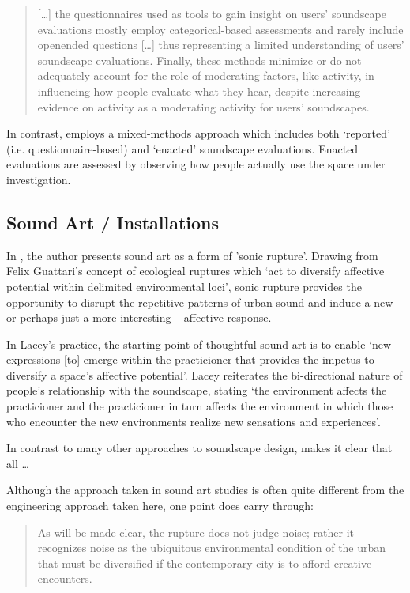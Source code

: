 \begin{quote}
  [\dots] the questionnaires used as tools to gain insight on users’ soundscape evaluations mostly employ categorical-based assessments and rarely include openended questions [\ldots] thus representing a limited understanding of users’ soundscape evaluations. Finally, these methods minimize or do not adequately account for the role of moderating factors, like activity, in influencing how people evaluate what they hear, despite increasing evidence on activity as a moderating activity for users' soundscapes.
\end{quote}

In contrast, \citet{Bild2018Public} employs a mixed-methods approach which includes both `reported' (i.e. questionnaire-based) and `enacted' soundscape evaluations. Enacted evaluations are assessed by observing how people actually use the space under investigation.  

\subsection{Sound Art / Installations}

In , the author presents sound art as a form of 'sonic rupture'. Drawing from Felix Guattari's  concept of ecological ruptures which `act to diversify affective potential within delimited environmental loci', sonic rupture provides the opportunity to disrupt the repetitive patterns of urban sound and induce a new -- or perhaps just a more interesting -- affective response. 

In Lacey's practice, the starting point of thoughtful sound art is to enable `new expressions [to] emerge within the practicioner that provides the impetus to diversify a space's affective potential'. Lacey reiterates the bi-directional nature of people's relationship with the soundscape, stating `the environment affects the practicioner and the practicioner in turn affects the environment in which those who encounter the new environments realize new sensations and experiences'.

In contrast to many other approaches to soundscape design,  makes it clear that all \dots

Although the approach taken in sound art studies is often quite different from the engineering approach taken here, one point does carry through: 

\begin{quote}
  As will be made clear, the rupture does not judge noise; rather it recognizes noise as the ubiquitous environmental condition of the urban that must be diversified if the contemporary city is to afford creative encounters. 
\end{quote}

